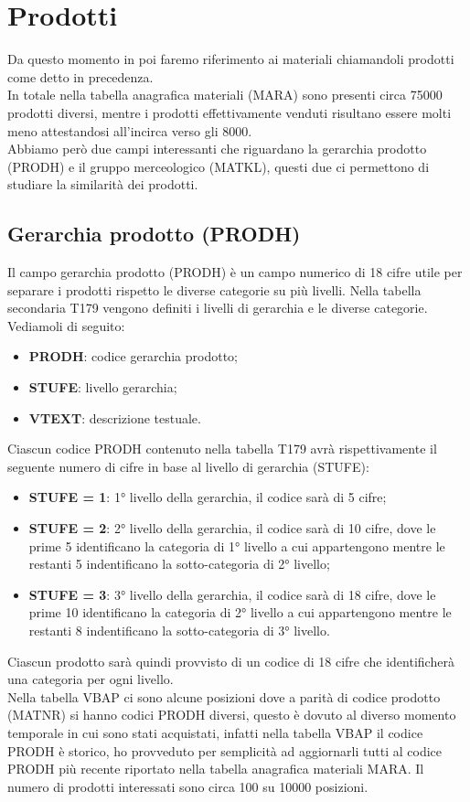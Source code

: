 \section{Prodotti}
Da questo momento in poi faremo riferimento ai materiali chiamandoli prodotti come detto in precedenza.\\
In totale nella tabella anagrafica materiali (MARA) sono presenti circa 75000 prodotti diversi, mentre i prodotti effettivamente venduti risultano essere molti meno attestandosi all'incirca verso gli 8000.\\
Abbiamo però due campi interessanti che riguardano la gerarchia prodotto (PRODH) e il gruppo merceologico (MATKL), questi due ci permettono di studiare la similarità dei prodotti.

\subsection{Gerarchia prodotto (PRODH)}
Il campo gerarchia prodotto (PRODH) è un campo numerico di 18 cifre utile per separare i prodotti rispetto le diverse categorie su più livelli.
Nella tabella secondaria T179 vengono definiti i livelli di gerarchia e le diverse categorie. 
Vediamoli di seguito:
\begin{itemize}
	\item \textbf{PRODH}: codice gerarchia prodotto;
	\item \textbf{STUFE}: livello gerarchia;
	\item \textbf{VTEXT}: descrizione testuale.
\end{itemize} 

Ciascun codice PRODH contenuto nella tabella T179 avrà rispettivamente il seguente numero di cifre in base al livello di gerarchia (STUFE):
\begin{itemize}
	\item \textbf{STUFE = 1}: 1° livello della gerarchia, il codice sarà di 5 cifre;
	\item \textbf{STUFE = 2}: 2° livello della gerarchia, il codice sarà di 10 cifre, dove le prime 5 identificano la categoria di 1° livello a cui appartengono mentre le restanti 5 indentificano la sotto-categoria di 2° livello;
	\item \textbf{STUFE = 3}: 3° livello della gerarchia, il codice sarà di 18 cifre, dove le prime 10 identificano la categoria di 2° livello a cui appartengono mentre le restanti 8 indentificano la sotto-categoria di 3° livello.
\end{itemize}
Ciascun prodotto sarà quindi provvisto di un codice di 18 cifre che identificherà una categoria per ogni livello.\\
Nella tabella VBAP ci sono alcune posizioni dove a parità di codice prodotto (MATNR) si hanno codici PRODH diversi, questo è dovuto al diverso momento temporale in cui sono stati acquistati, infatti nella tabella VBAP il codice PRODH è storico, ho provveduto per semplicità ad aggiornarli tutti al codice PRODH più recente riportato nella tabella anagrafica materiali MARA.
Il numero di prodotti interessati sono circa 100 su 10000 posizioni.\\

